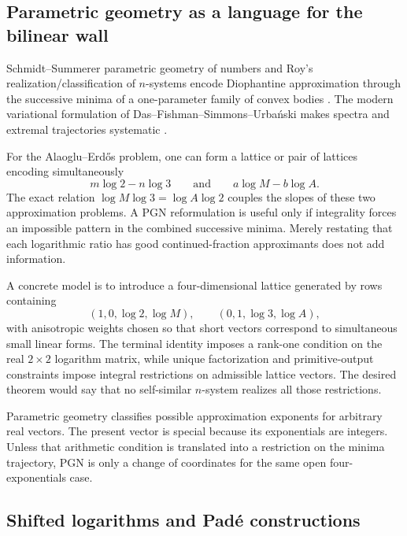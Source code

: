 \documentclass[10pt,letterpaper]{article}
\begin{document}
\subsection{Parametric geometry as a language for the bilinear wall}

Schmidt--Summerer parametric geometry of numbers and Roy's realization/classification of
\(n\)-systems encode Diophantine approximation through the successive minima of a
one-parameter family of convex bodies \cite{SchmidtSummerer,RoyPGN}.  The modern variational
formulation of Das--Fishman--Simmons--Urba\'nski makes spectra and extremal trajectories
systematic \cite{DFSU2024}.

For the Alaoglu--Erd\H{o}s problem, one can form a lattice or pair of lattices encoding
simultaneously
\[
  m\log2-n\log3
  \qquad\text{and}\qquad
  a\log M-b\log A.
\]
The exact relation \(\log M\log3=\log A\log2\) couples the slopes of these two approximation
problems.  A PGN reformulation is useful only if integrality forces an impossible pattern in
the combined successive minima.  Merely restating that each logarithmic ratio has good
continued-fraction approximants does not add information.

A concrete model is to introduce a four-dimensional lattice generated by rows containing
\[
  (1,0,\log2,\log M),
  \qquad
  (0,1,\log3,\log A),
\]
with anisotropic weights chosen so that short vectors correspond to simultaneous small
linear forms.  The terminal identity imposes a rank-one condition on the real \(2\times2\)
logarithm matrix, while unique factorization and primitive-output constraints impose
integral restrictions on admissible lattice vectors.  The desired theorem would say that no
self-similar \(n\)-system realizes all those restrictions.

\begin{warningbox}
Parametric geometry classifies possible approximation exponents for arbitrary real vectors.
The present vector is special because its exponentials are integers.  Unless that arithmetic
condition is translated into a restriction on the minima trajectory, PGN is only a change of
coordinates for the same open four-exponentials case.
\end{warningbox}

\subsection{Shifted logarithms and Pad\'e constructions}
\end{document}
